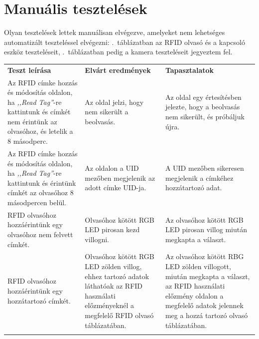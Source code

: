 \documentclass[
]{thesis-ekf}
\theoremstyle{definition}
\theoremstyle{remark}
\begin{document}
	\section{Manuális tesztelések}
	Olyan tesztelések lettek manuálisan elvégezve, amelyeket nem lehetséges automatizált teszteléssel elvégezni: .~táblázatban az RFID olvasó és a kapcsoló eszköz teszteléseit, .~táblázatban pedig a kamera teszteléseit jegyeztem fel.
	\begin{table}
		\begin{tabular}{|p{}|p{}|p{}|}
			\hline
			\rowcolor[HTML]{C0C0C0} 
			{\color[HTML]{333333} \textbf{Teszt leírása}} &
			{\color[HTML]{333333} \textbf{Elvárt eredmények}} &
			{\color[HTML]{333333} \textbf{Tapasztalatok}}
			\\
			\rowcolor[HTML]{EFEFEF} 
				Az RFID címke hozzás és módosítás oldalon, ha \emph{,,Read Tag''}-re kattintunk és címkét nem érintünk az olvasóhoz, és letelik a 8 másodperc. &
				 
				Az oldal jelzi, hogy nem sikerült a beolvasás. &
			
				Az oldal egy értesítésben jelezte, hogy a beolvasás nem sikerült, és próbáljuk újra.
				 \\
				Az RFID címke hozzás és módosítás oldalon, ha \emph{,,Read Tag''}-re kattintunk és érintünk  címkét az olvasóhoz 8 másodpercen belül. &
				
				Az oldalon a UID mezőben megjelenik az adott címke UID-ja. &
			
				A UID mezőben sikeresen megjelenik a címkéhez hozzátartozó adat.
				  \\
			\rowcolor[HTML]{EFEFEF} 
				RFID olvasóhoz hozzáérintünk egy olvasóhoz nem felvett
				címkét. &
			
				Olvasóhoz kötött RGB LED pirosan kezd villogni. &
			
				Az olvasóhoz kötött RGB LED pirosan villog miután megkapta a választ. 
				\\
			
				RFID olvasóhoz hozzáérintünk egy hozzátartozó címkét. &
			
				Olvasóhoz kötött RGB LED zölden villog, ehhez tartozó adatok láthatóak az RFID használati előzményeknél a megfelelő RFID olvasó táblázatában. &
			
				Az olvasóhoz kötött RBG LED zölden villogott, miután megkapta a választ, az RFID használati előzmény oldalon a megfelelő adatok jelennek meg a hozzá tartozó olvasó táblázatában.\\
				\rowcolor[HTML]{EFEFEF} 
				

\end{tabular}
\end{table}
\end{document}
